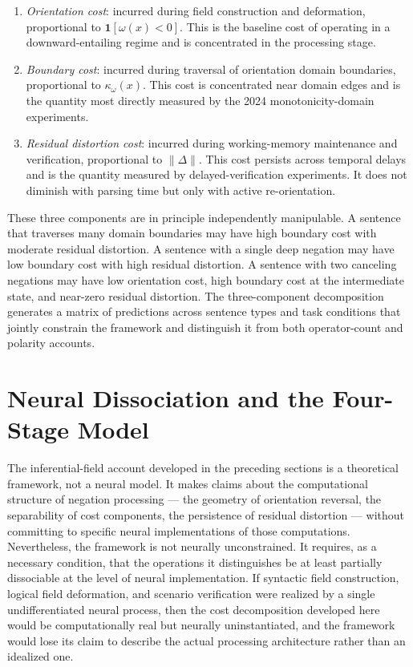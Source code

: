 \documentclass[12pt]{article}
\theoremstyle{remark}
\begin{document}
\begin{enumerate}
\item \emph{Orientation cost}: incurred during field construction and
deformation, proportional to $\mathbf{1}[\omega(x) < 0]$. This is the
baseline cost of operating in a downward-entailing regime and is
concentrated in the processing stage.

\item \emph{Boundary cost}: incurred during traversal of orientation
domain boundaries, proportional to $\kappa_\omega(x)$. This cost is
concentrated near domain edges and is the quantity most directly
measured by the 2024 monotonicity-domain experiments.

\item \emph{Residual distortion cost}: incurred during working-memory
maintenance and verification, proportional to $\|\Delta\|$. This cost
persists across temporal delays and is the quantity measured by
delayed-verification experiments. It does not diminish with parsing
time but only with active re-orientation.
\end{enumerate}

These three components are in principle independently manipulable. A
sentence that traverses many domain boundaries may have high boundary
cost with moderate residual distortion. A sentence with a single deep
negation may have low boundary cost with high residual distortion. A
sentence with two canceling negations may have low orientation cost, high
boundary cost at the intermediate state, and near-zero residual
distortion. The three-component decomposition generates a matrix of
predictions across sentence types and task conditions that jointly
constrain the framework and distinguish it from both operator-count and
polarity accounts.

\section{Neural Dissociation and the Four-Stage Model}

The inferential-field account developed in the preceding sections is a
theoretical framework, not a neural model. It makes claims about the
computational structure of negation processing --- the geometry of
orientation reversal, the separability of cost components, the
persistence of residual distortion --- without committing to specific
neural implementations of those computations. Nevertheless, the framework
is not neurally unconstrained. It requires, as a necessary condition,
that the operations it distinguishes be at least partially dissociable at
the level of neural implementation. If syntactic field construction,
logical field deformation, and scenario verification were realized by a
single undifferentiated neural process, then the cost decomposition
developed here would be computationally real but neurally uninstantiated,
and the framework would lose its claim to describe the actual processing
architecture rather than an idealized one.
\end{document}
